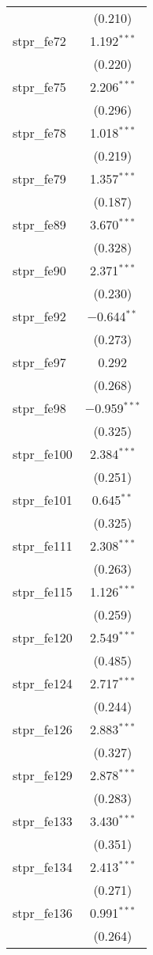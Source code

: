 \begin{table}[!htbp]
\begin{tabular}{@{\extracolsep{5pt}}lc}
  & (0.210) \\ 
  stpr\_fe72 & 1.192$^{***}$ \\ 
  & (0.220) \\ 
  stpr\_fe75 & 2.206$^{***}$ \\ 
  & (0.296) \\ 
  stpr\_fe78 & 1.018$^{***}$ \\ 
  & (0.219) \\ 
  stpr\_fe79 & 1.357$^{***}$ \\ 
  & (0.187) \\ 
  stpr\_fe89 & 3.670$^{***}$ \\ 
  & (0.328) \\ 
  stpr\_fe90 & 2.371$^{***}$ \\ 
  & (0.230) \\ 
  stpr\_fe92 & $-$0.644$^{**}$ \\ 
  & (0.273) \\ 
  stpr\_fe97 & 0.292 \\ 
  & (0.268) \\ 
  stpr\_fe98 & $-$0.959$^{***}$ \\ 
  & (0.325) \\ 
  stpr\_fe100 & 2.384$^{***}$ \\ 
  & (0.251) \\ 
  stpr\_fe101 & 0.645$^{**}$ \\ 
  & (0.325) \\ 
  stpr\_fe111 & 2.308$^{***}$ \\ 
  & (0.263) \\ 
  stpr\_fe115 & 1.126$^{***}$ \\ 
  & (0.259) \\ 
  stpr\_fe120 & 2.549$^{***}$ \\ 
  & (0.485) \\ 
  stpr\_fe124 & 2.717$^{***}$ \\ 
  & (0.244) \\ 
  stpr\_fe126 & 2.883$^{***}$ \\ 
  & (0.327) \\ 
  stpr\_fe129 & 2.878$^{***}$ \\ 
  & (0.283) \\ 
  stpr\_fe133 & 3.430$^{***}$ \\ 
  & (0.351) \\ 
  stpr\_fe134 & 2.413$^{***}$ \\ 
  & (0.271) \\ 
  stpr\_fe136 & 0.991$^{***}$ \\ 
  & (0.264) \\ 

\end{tabular}
\end{table}
